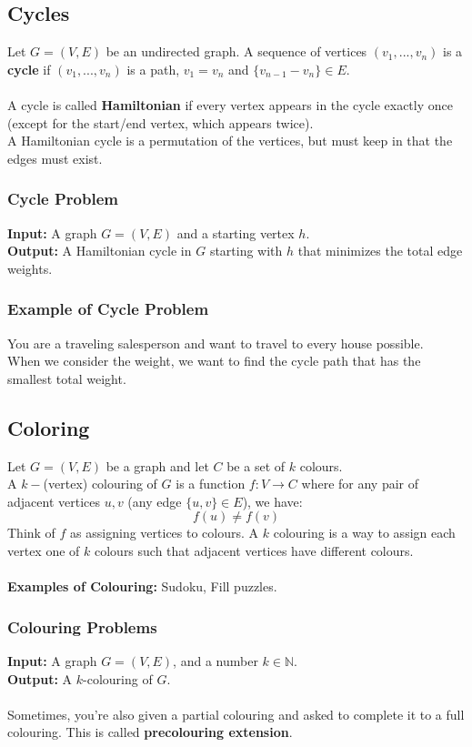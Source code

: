 \documentclass{article}
\begin{document}
\subsection{Cycles}
Let $G = (V, E)$ be an undirected graph.
A sequence of vertices $(v_1, ..., v_n)$ is a \textbf{cycle} if $(v_1, ..., v_n)$ is a path, $v_1 = v_n$ and $\{v_{n - 1} - v_n\} \in E$.\\
\\
A cycle is called \textbf{Hamiltonian} if every vertex appears in the cycle exactly once (except for the start/end vertex, which appears twice).\\
A Hamiltonian cycle is a permutation of the vertices, but must keep in that the edges must exist.
\\
\subsubsection{Cycle Problem}
\textbf{Input: }A graph $G = (V, E)$ and a starting vertex $h$.\\
\textbf{Output: }A Hamiltonian cycle in $G$ starting with $h$ that minimizes the total edge weights.
\subsubsection{Example of Cycle Problem}
You are a traveling salesperson and want to travel to every house possible.\\
When we consider the weight, we want to find the cycle path that has the smallest total weight.

\subsection{Coloring}
Let $G = (V, E)$ be a graph and let $C$ be a set of $k$ colours.\\
A $k-$(vertex) colouring of $G$ is a function $f: V \to C$ where for any pair of adjacent vertices $u, v$ (any edge $\{u, v\} \in E$), we have:
$$f(u) \neq f(v)$$
Think of $f$ as assigning vertices to colours. A $k$ colouring is a way to assign each vertex one of $k$ colours such that adjacent vertices have different colours.
\\
\\
\textbf{Examples of Colouring: }Sudoku, Fill puzzles.
\subsubsection{Colouring Problems}
\textbf{Input: }A graph $G = (V,E)$, and a number $k \in \mathbb{N}$.\\
\textbf{Output: }A $k$-colouring of $G$.\\
\\
Sometimes, you're also given a partial colouring and asked to complete it to a full colouring. This is called \textbf{precolouring extension}.
\end{document}
